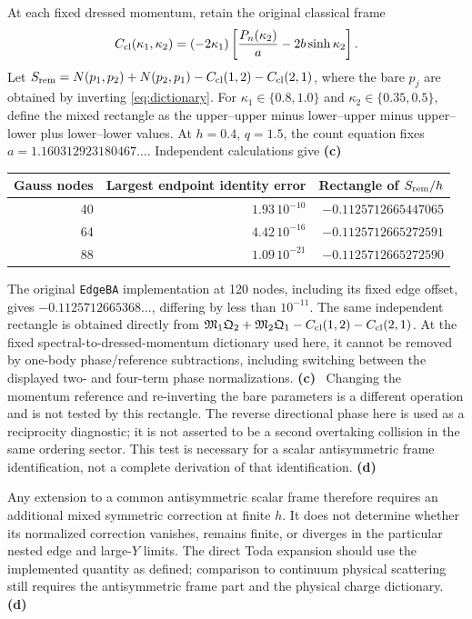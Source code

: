 \documentclass[11pt,a4paper]{article}
\newcommand{\Lc}{\textbf{(c)}\ }
\newcommand{\Ld}{\textbf{(d)}\ }
\begin{document}
At each fixed dressed momentum, retain the original classical frame
\[
 C_{\rm cl}(\kappa_1,\kappa_2)
 =(-2\kappa_1)\left[\frac{P_n(\kappa_2)}a-2b\sinh\kappa_2\right].
\]
Let $S_{\rm rem}=N(p_1,p_2)+N(p_2,p_1)-C_{\rm cl}(1,2)-C_{\rm cl}(2,1)$,
where the bare $p_j$ are obtained by inverting \eqref{eq:dictionary}.
For $\kappa_1\in\{0.8,1.0\}$ and $\kappa_2\in\{0.35,0.5\}$, define
the mixed rectangle as the upper--upper minus lower--upper minus
upper--lower plus lower--lower values. At $h=0.4$, $q=1.5$, the count
equation fixes $a=1.160312923180467\ldots$. Independent calculations give
\Lc
\begin{center}
\begin{tabular}{rrr}\toprule
Gauss nodes & Largest endpoint identity error & Rectangle of $S_{\rm rem}/h$\\\midrule
40 & $1.93\,10^{-10}$ & $-0.1125712665447065$\\
64 & $4.42\,10^{-16}$ & $-0.1125712665272591$\\
88 & $1.09\,10^{-21}$ & $-0.1125712665272590$\\\bottomrule
\end{tabular}
\end{center}
The original \texttt{EdgeBA} implementation at 120 nodes, including its
fixed edge offset, gives $-0.1125712665368\ldots$, differing by less than
$10^{-11}$. The same independent rectangle is obtained directly from
$\mathfrak M_1\mathfrak Q_2+\mathfrak M_2\mathfrak Q_1
-C_{\rm cl}(1,2)-C_{\rm cl}(2,1)$.
At the fixed spectral-to-dressed-momentum dictionary used here, it cannot
be removed by one-body phase/reference subtractions, including switching
between the displayed two- and four-term phase normalizations. \Lc
Changing the momentum reference and re-inverting the bare parameters is a
different operation and is not tested by this rectangle.
The reverse directional phase here is used as a reciprocity diagnostic;
it is not asserted to be a second overtaking collision in the same
ordering sector. This test is necessary for a scalar antisymmetric
frame identification, not a complete derivation of that identification.
\Ld

Any extension to a common antisymmetric scalar frame therefore requires
an additional mixed symmetric correction at finite $h$. It does not determine whether its normalized correction
vanishes, remains finite, or diverges in the particular nested edge and
large-$Y$ limits. The direct Toda expansion should use the implemented
quantity as defined; comparison to continuum physical scattering still
requires the antisymmetric frame part and the physical charge dictionary.
\Ld
\end{document}
